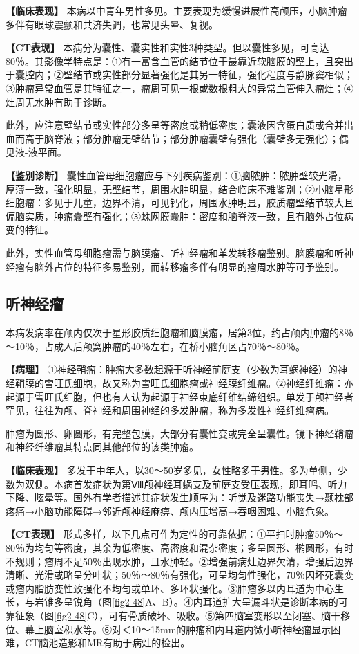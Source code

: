\textbf{【临床表现】}
本病以中青年男性多见。主要表现为缓慢进展性高颅压，小脑肿瘤多伴有眼球震颤和共济失调，也常见头晕、复视。

\textbf{【CT表现】}
本病分为囊性、囊实性和实性3种类型。但以囊性多见，可高达80％。其影像学特点是：①有一富含血管的结节位于最靠近软脑膜的壁上，且突出于囊腔内；②壁结节或实性部分显著强化是其另一特征，强化程度与静脉窦相似；③肿瘤异常血管是其特征之一，瘤周可见一根或数根粗大的异常血管伸入瘤灶；④灶周无水肿有助于诊断。

此外，应注意壁结节或实性部分多呈等密度或稍低密度；囊液因含蛋白质或合并出血而高于脑脊液；部分肿瘤无壁结节；部分肿瘤囊壁有强化（囊壁多无强化）；偶见液-液平面。

\textbf{【鉴别诊断】}
囊性血管母细胞瘤应与下列疾病鉴别：①脑脓肿：脓肿壁较光滑，厚薄一致，强化明显，无壁结节，周围水肿明显，结合临床不难鉴别；②小脑星形细胞瘤：多见于儿童，边界不清，可见钙化，周围水肿明显，胶质瘤壁结节较大且偏脑实质，肿瘤囊壁有强化；③蛛网膜囊肿：密度和脑脊液一致，且有脑外占位病变的特征。

此外，实性血管母细胞瘤需与脑膜瘤、听神经瘤和单发转移瘤鉴别。脑膜瘤和听神经瘤有脑外占位的特征多易鉴别，而转移瘤多伴有明显的瘤周水肿等可予鉴别。

\subsection{听神经瘤}

本病发病率在颅内仅次于星形胶质细胞瘤和脑膜瘤，居第3位，约占颅内肿瘤的8％～10％，占成人后颅窝肿瘤的40％左右，在桥小脑角区占70％～80％。

\textbf{【病理】}
①神经鞘瘤：肿瘤大多数起源于听神经前庭支（少数为耳蜗神经）的神经鞘膜的雪旺氏细胞，故又称为雪旺氏细胞瘤或神经膜纤维瘤。②神经纤维瘤：亦起源于雪旺氏细胞，但也有人认为起源于神经束底纤维结缔组织。单发于颅神经者罕见，往往为颅、脊神经和周围神经的多发肿瘤，称为多发性神经纤维瘤病。

肿瘤为圆形、卵圆形，有完整包膜，大部分有囊性变或完全呈囊性。镜下神经鞘瘤和神经纤维瘤其特点同其他部位的该类肿瘤。

\textbf{【临床表现】}
多发于中年人，以30～50岁多见，女性略多于男性。多为单侧，少数为双侧。本病首发症状为第Ⅷ颅神经耳蜗支及前庭支受压表现，即耳鸣、听力下降、眩晕等。国外有学者描述其症状发生顺序为：听觉及迷路功能丧失→颞枕部疼痛→小脑功能障碍→邻近颅神经麻痹、颅内压增高→吞咽困难、小脑危象。

\textbf{【CT表现】}
形式多样，以下几点可作为定性的可靠依据：①平扫时肿瘤50％～80％为均匀等密度，其余为低密度、高密度和混杂密度；多呈圆形、椭圆形，有时不规则；瘤周不足50％出现水肿，且水肿轻。②增强前病灶边界欠清，增强后边界清晰、光滑或略呈分叶状；50％～80％有强化，可呈均匀性强化，70％因坏死囊变或瘤内脂肪变性致强化不均匀或单环、多环状强化。③肿瘤多以内耳道为中心生长，与岩锥多呈锐角（图\ref{fig2-48}A、B）。④内耳道扩大呈漏斗状是诊断本病的可靠征象（图\ref{fig2-48}C），可有骨质破坏、吸收。⑤第四脑室变形以至闭塞、脑干移位、幕上脑室积水等。⑥对＜10～15mm的肿瘤和内耳道内微小听神经瘤显示困难，CT脑池造影和MR有助于病灶的检出。

